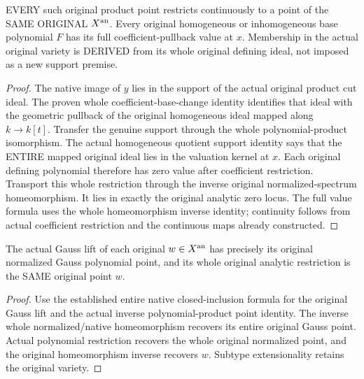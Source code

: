 \begin{definition}
\label{local:actual-product-original-analytic-restriction}
\leanok
{}
EVERY such original product point restricts continuously to a point of
the SAME ORIGINAL $X^{\rm an}$. Every original homogeneous or inhomogeneous
base polynomial $F$ has its full coefficient-pullback value at $x$.
Membership in the actual original variety is DERIVED from its whole
original defining ideal, not imposed as a new support premise.
\end{definition}
\begin{proof}
The native image of $y$ lies in the support of the actual original product
cut ideal. The proven whole coefficient-base-change identity identifies
that ideal with the geometric pullback of the original homogeneous ideal
mapped along $k\to k[t]$. Transfer the genuine support through the whole
polynomial-product isomorphism. The actual homogeneous quotient support
identity says that the ENTIRE mapped original ideal lies in the valuation
kernel at $x$. Each original defining polynomial therefore has zero
value after coefficient restriction. Transport this whole restriction
through the inverse original normalized-spectrum homeomorphism. It lies
in exactly the original analytic zero locus. The full value formula uses
the whole homeomorphism inverse identity; continuity follows from actual
coefficient restriction and the continuous maps already constructed.
\end{proof}

\begin{lemma}
\label{local:actual-product-restriction-gauss-inverse}
\leanok
{}
The actual Gauss lift of each original $w\in X^{\rm an}$ has precisely its
original normalized Gauss polynomial point, and its whole original
analytic restriction is the SAME original point $w$.
\end{lemma}
\begin{proof}
Use the established entire native closed-inclusion formula for the
original Gauss lift and the actual inverse polynomial-product point
identity. The inverse whole normalized/native homeomorphism recovers
its entire original Gauss point. Actual polynomial restriction recovers
the whole original normalized point, and the original homeomorphism
inverse recovers $w$. Subtype extensionality retains the original variety.
\end{proof}
